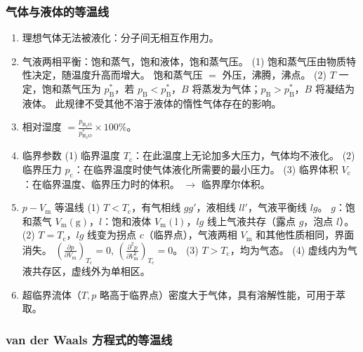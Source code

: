 \subsubsection{气体与液体的等温线}

\begin{enumerate}
    \item 理想气体无法被液化：分子间无相互作用力。
    \item 气液两相平衡：饱和蒸气，饱和液体，饱和蒸气压。
    (1) 饱和蒸气压由物质特性决定，随温度升高而增大。 饱和蒸气压 $=$ 外压，沸腾，沸点。
    (2) $T$ 一定，饱和蒸气压为 $p_{\mathrm{B}}^*$，若 $p_{\mathrm{B}} < p_{\mathrm{B}}^*$，$B$ 将蒸发为气体；$p_{\mathrm{B}} > p_{\mathrm{B}}^*$，$B$ 将凝结为液体。 此规律不受其他不溶于液体的惰性气体存在的影响。
    \item 相对湿度 $= \frac{p_{\mathrm{H_2O}}}{p_{\mathrm{H_2O}}^*} \times 100\%$。
    \item 临界参数
    (1) 临界温度 $T_{\mathrm{c}}$：在此温度上无论加多大压力，气体均不液化。
    (2) 临界压力 $p_{\mathrm{c}}$：在临界温度时使气体液化所需要的最小压力。
    (3) 临界体积 $V_{\mathrm{c}}$：在临界温度、临界压力时的体积。 $\longrightarrow$ 临界摩尔体积。
    \item $p-V_{\mathrm{m}}$ 等温线
    (1) $T < T_{\mathrm{c}}$，有气相线 $gg'$，液相线 $ll'$，气液平衡线 $lg$。 $g$：饱和蒸气 $V_{\mathrm{m}}(\mathrm{g})$，$l$：饱和液体 $V_{\mathrm{m}}(\mathrm{l})$，$lg$ 线上气液共存（露点 $g$，泡点 $l$）。
    (2) $T = T_{\mathrm{c}}$，$lg$ 线变为拐点 $c$（临界点），气液两相 $V_{\mathrm{m}}$ 和其他性质相同，界面消失。 $\left(\frac{\partial p}{\partial V_{\mathrm{m}}}\right)_{T_{\mathrm{c}}} = 0$, $\left(\frac{\partial^2 p}{\partial V_{\mathrm{m}}^2}\right)_{T_{\mathrm{c}}} = 0$。
    (3) $T > T_{\mathrm{c}}$，均为气态。
    (4) 虚线内为气液共存区，虚线外为单相区。
    \item 超临界流体（$T, p$ 略高于临界点）密度大于气体，具有溶解性能，可用于萃取。
\end{enumerate}

\subsubsection{van der Waals 方程式的等温线}

